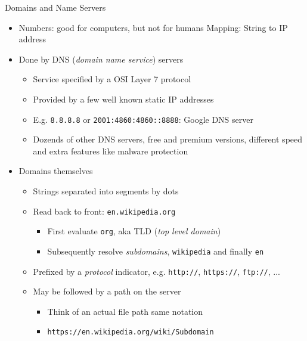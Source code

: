 
\begin{frame}{Domains and Name Servers}
%
\begin{itemize}
\item Numbers: good for computers, but not for humans \Thus Mapping: String to IP address
\item Done by DNS (\emph{domain name service}) servers
	\begin{itemize}
	\item Service specified by a OSI Layer 7 protocol
	\item Provided by a few well known static IP addresses
	\item E.\;g. \texttt{8.8.8.8} or \texttt{2001:4860:4860::8888}: Google DNS server
	\item Dozends of other DNS servers, free and premium versions, different speed and extra features like malware protection
	\end{itemize}
\pause
\item Domains themselves
	\begin{itemize}
	\item Strings separated into segments by dots
	\item Read back to front: \texttt{en.wikipedia.org}
		\begin{itemize}
		\item First evaluate \texttt{org}, aka TLD (\emph{top level domain})
		\item Subsequently resolve \emph{subdomains}, \ie \texttt{wikipedia} and finally \texttt{en}
		\end{itemize}
	\pause
	\item Prefixed by a \emph{protocol} indicator, e.\;g. \texttt{http://}, \texttt{https://}, \texttt{ftp://}, ...
	\pause
	\item May be followed by a path on the server
		\begin{itemize}
		\item Think of an actual file path \thus same notation
		\item \texttt{{\color{gray}https://en.wikipedia.org}/wiki/Subdomain}
		\end{itemize}
	\end{itemize}
\end{itemize}
%
\end{frame}


